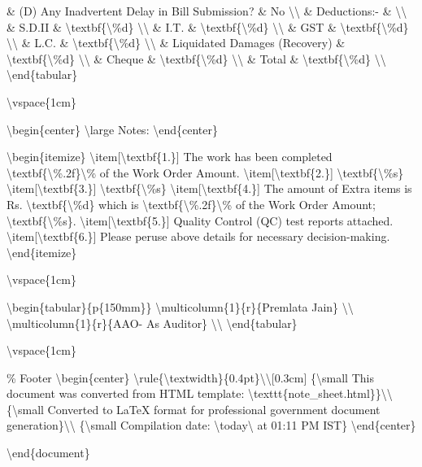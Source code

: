 \& (D) Any Inadvertent Delay in Bill Submission? \& No \textbackslash{}\textbackslash{}
\& Deductions:- \& \textbackslash{}\textbackslash{}
\& S.D.II \& \textbackslash{}textbf\{\textbackslash{}\%d\} \textbackslash{}\textbackslash{}
\& I.T. \& \textbackslash{}textbf\{\textbackslash{}\%d\} \textbackslash{}\textbackslash{}
\& GST \& \textbackslash{}textbf\{\textbackslash{}\%d\} \textbackslash{}\textbackslash{}
\& L.C. \& \textbackslash{}textbf\{\textbackslash{}\%d\} \textbackslash{}\textbackslash{}
\& Liquidated Damages (Recovery) \& \textbackslash{}textbf\{\textbackslash{}\%d\} \textbackslash{}\textbackslash{}
\& Cheque \& \textbackslash{}textbf\{\textbackslash{}\%d\} \textbackslash{}\textbackslash{}
\& Total \& \textbackslash{}textbf\{\textbackslash{}\%d\} \textbackslash{}\textbackslash{}
\textbackslash{}end\{tabular\}

\textbackslash{}vspace\{1cm\}

\textbackslash{}begin\{center\}
\textbackslash{}large Notes:
\textbackslash{}end\{center\}

\textbackslash{}begin\{itemize\}
\textbackslash{}item[\textbackslash{}textbf\{1.\}] The work has been completed \textbackslash{}textbf\{\textbackslash{}\%.2f\}\textbackslash{}\% of the Work Order Amount.
\textbackslash{}item[\textbackslash{}textbf\{2.\}] \textbackslash{}textbf\{\textbackslash{}\%s\}
\textbackslash{}item[\textbackslash{}textbf\{3.\}] \textbackslash{}textbf\{\textbackslash{}\%s\}
\textbackslash{}item[\textbackslash{}textbf\{4.\}] The amount of Extra items is Rs. \textbackslash{}textbf\{\textbackslash{}\%d\} which is \textbackslash{}textbf\{\textbackslash{}\%.2f\}\textbackslash{}\% of the Work Order Amount; \textbackslash{}textbf\{\textbackslash{}\%s\}.
\textbackslash{}item[\textbackslash{}textbf\{5.\}] Quality Control (QC) test reports attached.
\textbackslash{}item[\textbackslash{}textbf\{6.\}] Please peruse above details for necessary decision-making.
\textbackslash{}end\{itemize\}

\textbackslash{}vspace\{1cm\}

\textbackslash{}begin\{tabular\}\{p\{150mm\}\}
\textbackslash{}multicolumn\{1\}\{r\}\{Premlata Jain\} \textbackslash{}\textbackslash{}
\textbackslash{}multicolumn\{1\}\{r\}\{AAO- As Auditor\} \textbackslash{}\textbackslash{}
\textbackslash{}end\{tabular\}

\textbackslash{}vspace\{1cm\}

\% Footer
\textbackslash{}begin\{center\}
\textbackslash{}rule\{\textbackslash{}textwidth\}\{0.4pt\}\textbackslash{}\textbackslash{}[0.3cm]
\{\textbackslash{}small This document was converted from HTML template: \textbackslash{}texttt\{note\_sheet.html\}\}\textbackslash{}\textbackslash{}
\{\textbackslash{}small Converted to LaTeX format for professional government document generation\}\textbackslash{}\textbackslash{}
\{\textbackslash{}small Compilation date: \textbackslash{}today\textbackslash{} at 01:11 PM IST\}
\textbackslash{}end\{center\}

\textbackslash{}end\{document\}
